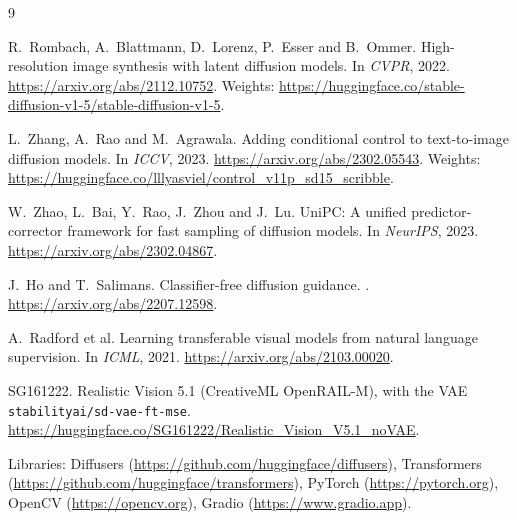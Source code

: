 \documentclass[11pt,a4paper]{article}
\begin{document}
\begin{thebibliography}{9}

R.~Rombach, A.~Blattmann, D.~Lorenz, P.~Esser and B.~Ommer.
\newblock High-resolution image synthesis with latent diffusion models.
\newblock In \emph{CVPR}, 2022. \url{https://arxiv.org/abs/2112.10752}.
\newblock Weights: \url{https://huggingface.co/stable-diffusion-v1-5/stable-diffusion-v1-5}.

L.~Zhang, A.~Rao and M.~Agrawala.
\newblock Adding conditional control to text-to-image diffusion models.
\newblock In \emph{ICCV}, 2023. \url{https://arxiv.org/abs/2302.05543}.
\newblock Weights: \url{https://huggingface.co/lllyasviel/control_v11p_sd15_scribble}.

W.~Zhao, L.~Bai, Y.~Rao, J.~Zhou and J.~Lu.
\newblock UniPC: A unified predictor-corrector framework for fast sampling of diffusion models.
\newblock In \emph{NeurIPS}, 2023. \url{https://arxiv.org/abs/2302.04867}.

J.~Ho and T.~Salimans.
\newblock Classifier-free diffusion guidance.
. \url{https://arxiv.org/abs/2207.12598}.

A.~Radford et al.
\newblock Learning transferable visual models from natural language supervision.
\newblock In \emph{ICML}, 2021. \url{https://arxiv.org/abs/2103.00020}.

SG161222.
\newblock Realistic Vision 5.1 (CreativeML OpenRAIL-M), with the VAE \texttt{stabilityai/sd-vae-ft-mse}.
\newblock \url{https://huggingface.co/SG161222/Realistic_Vision_V5.1_noVAE}.

Libraries: Diffusers (\url{https://github.com/huggingface/diffusers}),
Transformers (\url{https://github.com/huggingface/transformers}), PyTorch (\url{https://pytorch.org}),
OpenCV (\url{https://opencv.org}), Gradio (\url{https://www.gradio.app}).

\end{thebibliography}
\end{document}
